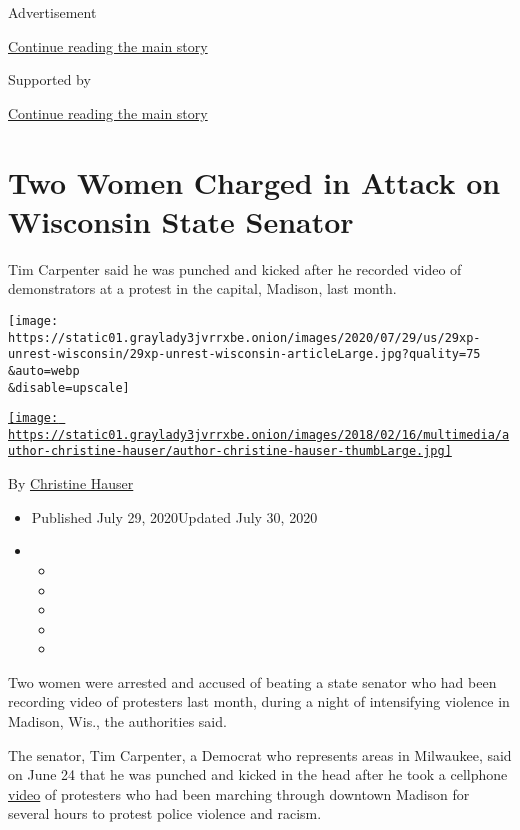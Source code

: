Advertisement

\protect\hyperlink{after-top}{Continue reading the main story}

Supported by

\protect\hyperlink{after-sponsor}{Continue reading the main story}

\hypertarget{two-women-charged-in-attack-on-wisconsin-state-senator}{%
\section{Two Women Charged in Attack on Wisconsin State
Senator}\label{two-women-charged-in-attack-on-wisconsin-state-senator}}

Tim Carpenter said he was punched and kicked after he recorded video of
demonstrators at a protest in the capital, Madison, last month.

\texttt{[image: https://static01.graylady3jvrrxbe.onion/images/2020/07/29/us/29xp-unrest-wisconsin/29xp-unrest-wisconsin-articleLarge.jpg?quality=75\\\&auto=webp\\\&disable=upscale]}

\href{https://www.nytimes3xbfgragh.onion/by/christine-hauser}{\texttt{[image: https://static01.graylady3jvrrxbe.onion/images/2018/02/16/multimedia/author-christine-hauser/author-christine-hauser-thumbLarge.jpg]}}

By
\href{https://www.nytimes3xbfgragh.onion/by/christine-hauser}{Christine
Hauser}

\begin{itemize}
\item
  Published July 29, 2020Updated July 30, 2020
\item
  \begin{itemize}
  \item
  \item
  \item
  \item
  \item
  \end{itemize}
\end{itemize}

Two women were arrested and accused of beating a state senator who had
been recording video of protesters last month, during a night of
intensifying violence in Madison, Wis., the authorities said.

The senator, Tim Carpenter, a Democrat who represents areas in
Milwaukee, said on June 24 that he was punched and kicked in the head
after he took a cellphone
\href{https://twitter.com/TimCarpenterMKE/status/1275716467007328258}{video}
of protesters who had been marching through downtown Madison for several
hours to protest police violence and racism.

